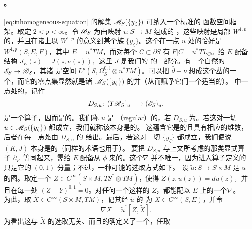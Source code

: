 \paragraph{\trLinearization。}\label{sub:linearization}
\eqref{eq:inhomogeneous-equation} 的解集 $\mathscr{M}_S(\{y_\zeta\})$ 可纳入一个标准的
函数空间框架。取定 $2<p<\infty$。令 $\mathscr{B}_S$ 为由映射 $u\colon S\to M$ 组成的%
\trBanachManifold，这些映射是局部 $W^{1,p}$ 的，并且在诸\trStriplikeEnd{}上以
$W^{1,p}$ 的意义\trConvergence{}到某个族 $\{y_\zeta\}$。这个\trManifold{}在一点
$u$ 处的\trTangentSpace{}恰好是 $W^{1,p}(S,E,F)$，其中 $E=u^*TM$，而对每个%
\trConnectedComponent{}$C\subset\partial S$ 有 $F|C=u^*TL_C$。给 $E$ 配备%
\trAlmostComplex{}结构 $J_E(z)=J(z,u(z))$，这里 $J$ 是我们的\trPerturbationDatum{}%
的一部分。有一个自然的\trBanach{}\trVectorBundle{}$\mathscr{E}_S\to\mathscr{B}_S$，其诸%
\trFiber{}是空间 $L^p(S,\Omega^{0,1}_S\otimes u^*TM)$。可以把 $\bar\partial-\nu$
想成这个丛的一个\trSmooth\trSection，而它的零点集显然就是诸\trModuliSpace{}%
$\mathscr{M}_S(\{y_\zeta\})$ 的并（从而赋予它们一个适当的\trTopology）。\trModuliSpace{}%
中一点处的\trLinearization，记作
\begin{equation}\label{eq:linearization}
D_{S,u}\colon (T\mathscr{B}_S)_u\longrightarrow(\mathscr{E}_S)_u,
\end{equation}
是一个\trNondegenerate\trCauchyRiemann{}算子，因而是\trFredholm{}的。我们称 $u$ 是%
\textbf{\trRegular}（regular）的，若 $D_{S,u}$ 为\trSurjective。若这对一切
$u\in\mathscr{M}_S(\{y_\zeta\})$ 都成立，我们就称该\trModuliSpace{}本身是\trRegular{}的。
这蕴含它是\trSmooth{}的且具有相应的维数，后者在每一点处由 $D_{S,u}$ 的%
\trFredholm{}\trIndex{}给出。最后，若这对一切 $\{y_\zeta\}$ 都成立，我们便说%
\trPerturbationDatum{}$(K,J)$ 本身是\trRegular{}的（同样的术语也用于\trFloerDatum）。
要把 $D_{S,u}$ 与上文所考虑的那类显式算子 $\bar\partial_\nabla$ 等同起来，需给 $E$
配备从 $\phi$ \trPullback{}来的\trSymplecticStructure。这个\trConnection{}$\nabla$
并不唯一，因为进入算子定义的只是它的 $(0,1)$-分量；不过，一种可能的选取方式如下。
设 $\tilde u\colon S\to S\times M$ 是 $u$ 的图。取定一个
$Z\in C^\infty(S\times M,TS^*\otimes TM)$，使得 $Z(z,u(z))=du(z)$，并且在每一处
$(Z-Y)^{0,1}=0$。对任何一个这样的 $Z$，都能配以 $E$ 上的一个\trConnection{}$\nabla$。
为此，取 $\widetilde X\in C^\infty(S\times M,TM)$，记其经 $\tilde u$ 的\trPullback{}%
为 $X\in C^\infty(S,E)$，并令
\begin{equation}\label{eq:connection-definition}
\nabla X=\tilde u^*[Z,\widetilde X].
\end{equation}
为看出这与 $\widetilde X$ 的选取无关、而且的确定义了一个\trConnection，任取

